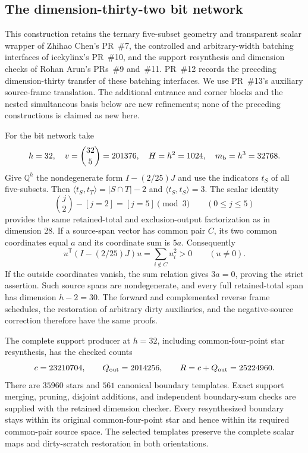 \subsection{The dimension-thirty-two bit network}
\label{sec:nested-bit-producer}

This construction retains the ternary five-subset geometry and transparent
scalar wrapper of Zhihao Chen's PR~\#7, the controlled and arbitrary-width
batching interfaces of icekylinx's PR~\#10, and the support resynthesis and
dimension checks of Rohan Arun's PRs~\#9 and~\#11. PR~\#12 records the
preceding dimension-thirty transfer of these batching interfaces. We use
PR~\#13's auxiliary source-frame translation. The additional entrance and
corner blocks and the nested simultaneous basis below are new refinements;
none of the preceding constructions is claimed as new here.

For the bit network take
\[
 h=32,\quad v=\binom{32}{5}=201376,\quad H=h^2=1024,
 \quad m_{\rm b}=h^3=32768.
\]
Give $\mathbb Q^h$ the nondegenerate form $I-(2/25)J$ and use the indicators
$t_S$ of all five-subsets. Then
$\langle t_S,t_T\rangle=|S\cap T|-2$ and
$\langle t_S,t_S\rangle=3$. The scalar identity
\[
 \binom j2-[j=2]=[j=5]\pmod3\qquad(0\le j\le5)
\]
provides the same retained-total and exclusion-output factorization as in
dimension 28. If a source-span vector has common pair $C$, its two common
coordinates equal $a$ and its coordinate sum is $5a$. Consequently
\[
 u^{\mathsf T}(I-(2/25)J)u=\sum_{i\notin C}u_i^2>0\qquad(u\ne0).
\]
If the outside coordinates vanish, the sum relation gives $3a=0$, proving
the strict assertion. Such source spans are nondegenerate, and every full
retained-total span has dimension $h-2=30$. The forward and complemented
reverse frame schedules, the restoration of arbitrary dirty auxiliaries,
and the negative-source correction therefore have the same proofs.

The complete support producer at $h=32$, including common-four-point star
resynthesis, has the checked counts
\[
 c=23210704,\qquad Q_{\rm out}=2014256,
 \qquad R=c+Q_{\rm out}=25224960.
\]
There are $35960$ stars and $561$ canonical boundary templates. Exact support
merging, pruning, disjoint additions, and independent boundary-sum checks
are supplied with the retained dimension checker. Every resynthesized
boundary stays within its original common-four-point star and hence within
its required common-pair source space. The selected templates preserve
the complete scalar maps and dirty-scratch restoration in both orientations.

